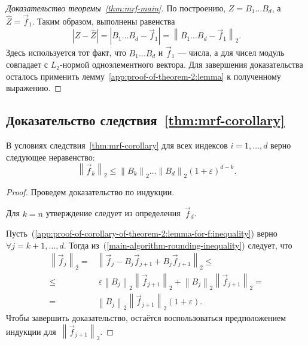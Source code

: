 \begin{proof}[Доказательство теоремы~\ref{thm:mrf-main}]
По построению, $Z = B_1 \ldots B_d$, а $\widehat{Z} = \vec{f}_1$. Таким образом, выполнены равенства
\begin{equation*}
\label{app:proof-of-theorem-2:difference-as-matrix-norm}
|Z - \widehat{Z}| = |B_1 \ldots B_d - \vec{f}_1| = \left\| B_1 \ldots B_d - \vec{f}_1 \right\|_2.
\end{equation*}
Здесь используется тот факт, что $B_1 \ldots B_d$ и $\vec{f}_1$ --- числа, а для чисел модуль совпадает с $L_2$-нормой одноэлементного вектора. Для завершения доказательства осталось применить лемму~\ref{app:proof-of-theorem-2:lemma} к полученному выражению.
\end{proof}

\subsection{Доказательство следствия~\ref{thm:mrf-corollary}}

\begin{lemma}
\label{app:proof-of-corollary-of-theorem-2:lemma-for-f}
В условиях следствия~\ref{thm:mrf-corollary} для всех индексов $i = 1, \ldots, d$ верно следующее неравенство:
\begin{equation}
\label{app:proof-of-corollary-of-theorem-2:lemma-for-f:inequality}
\left\| \vec{f}_k \right\|_2 \leq \left\| B_k \right\|_2 \ldots \left\| B_d \right\|_2 (1 + \varepsilon)^{d - k}.
\end{equation}
\end{lemma}
\begin{proof}
Проведем доказательство по индукции.

Для $k = n$ утверждение следует из определения~$\vec{f}_d$.

Пусть~(\ref{app:proof-of-corollary-of-theorem-2:lemma-for-f:inequality}) верно $\forall j = k + 1, \ldots, d$. Тогда из~(\ref{main-algorithm-rounding-inequality}) следует, что
\begin{align*}
\left\| \vec{f}_j \right\|_2 = &\left\| \vec{f}_j - B_j\vec{f}_{j + 1} + B_j\vec{f}_{j + 1} \right\|_2 \leq \\
\leq & ~ \varepsilon \left\| B_j \right\|_2 \left\| \vec{f}_{j + 1} \right \|_2 + \left\| B_j \right\|_2 \left\| \vec{f}_{j + 1} \right \|_2 = \\
 = &\left\| B_j \right\|_2 \left\| \vec{f}_{j + 1} \right \|_2 (1 + \varepsilon).
\end{align*}
Чтобы завершить доказательство, остаётся воспользоваться предположением индукции для~$\left\| \vec{f}_{j + 1} \right \|_2$.
\end{proof}

